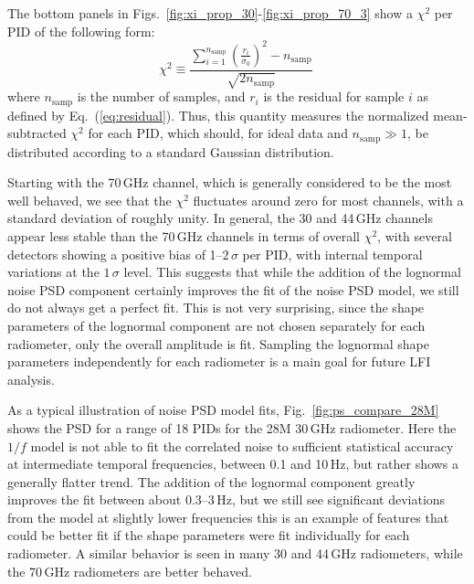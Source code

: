 \documentclass{aa}
\begin{document}
The bottom panels in
Figs.~\ref{fig:xi_prop_30}-\ref{fig:xi_prop_70_3} show a $\chi^2$ per
PID of the following form:
\begin{equation}
  \chi^2 \equiv
  \frac{\sum_{i=1}^{n_\mathrm{samp}}\left(\frac{r_i}{\sigma_0}\right)^2 -
    n_\mathrm{samp}}{\sqrt{2n_\mathrm{samp}}}\
  \label{eq:chisq}
\end{equation}
where $n_\mathrm{samp}$ is the number of samples, and $r_i$ is the
residual for sample $i$ as defined by Eq.~(\ref{eq:residual}). Thus,
this quantity measures the normalized mean-subtracted $\chi^2$ for
each PID, which should, for ideal data and $n_\mathrm{samp}\gg1$, be
distributed according to a standard Gaussian distribution. 

Starting with the 70\,GHz channel, which is generally considered to be the most
well behaved, we see that the $\chi^2$ fluctuates around zero for most
channels, with a standard deviation of roughly unity. 
In general, the 30 and 44\,GHz channels appear less stable than
the 70\,GHz channels in terms of overall $\chi^2$, with several detectors
showing a positive bias of 1--$2\,\sigma$ per PID, with
internal temporal variations at the $1\,\sigma$ level. This suggests that
while the addition of the lognormal noise PSD component certainly improves
the fit of the noise PSD model, we still do not 
always get a perfect fit. This is not very surprising, since the 
shape parameters of the lognormal component are not chosen separately for each
radiometer, only the overall amplitude is fit. 
Sampling the lognormal shape parameters independently for each 
radiometer is a main goal for future LFI analysis. 

As a typical illustration of noise PSD model fits, Fig.~\ref{fig:ps_compare_28M} 
shows the PSD for a range of 18 PIDs for
the 28M 30\,GHz radiometer. Here the $1/f$ model is
not able to fit the correlated noise to sufficient statistical
accuracy at intermediate temporal frequencies, between 0.1 and 10\,Hz,
but rather shows a generally flatter trend. The addition of the lognormal
component greatly improves the fit between about 0.3--3\,Hz, but we 
still see significant deviations from the model at slightly lower frequencies
this is an example of features that could be better fit if the shape parameters
were fit individually for each radiometer. 
A similar behavior is seen in many 30 and 44\,GHz radiometers, 
while the 70\,GHz radiometers are better behaved.
\end{document}
